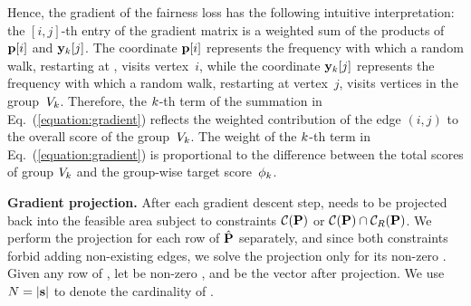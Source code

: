 \documentclass[sigconf, anonymous, review]{acmart}
\begin{document}
Hence, the gradient of the fairness loss has the following intuitive interpretation:
the $[i, j]$-th entry of the gradient matrix is a weighted sum of the products of 
$\mathbf{{p}}[i]$ and $\mathbf{{y}}_k[j]$. 
The coordinate $\mathbf{{p}}[i]$ represents the frequency with which a random walk, restarting at \vectv, visits vertex~$i$, 
while the coordinate $\mathbf{{y}}_k[j]$ represents the frequency with which a random walk, restarting at vertex~$j$, 
visits vertices in the group~$V_k$. 
Therefore, the $k$-th term of the summation in Eq.~(\ref{equation:gradient})
reflects the weighted contribution of the edge $(i, j)$ 
to the overall \pagerank score of the group~$V_k$.
The weight of the $k$-th term  in Eq.~(\ref{equation:gradient}) 
is proportional to the difference between the total \pagerank scores 
of group $V_k$ and the group-wise target score~$\phi_k$.

\vspace{1mm}
\noindent
\textbf{Gradient projection.} 
After each gradient descent step, 
\newtransmatrix needs to be projected back into the feasible area subject to constraints $\mathcal{C}(\mathbf{{P}})$ or $\mathcal{C}(\mathbf{{P}}) \cap \mathcal{C}_R(\mathbf{{P}})$.
We perform the projection for each row of $\hat{\mathbf{{P}}}$ separately, and since both constraints forbid adding non-existing edges, we solve the projection only for its non-zero . Given any row of \newtransmatrix, let \vects be  non-zero , and \vectsopt be the vector after projection. We use $N = |
\mathbf{{s}}|$ to denote the cardinality of \vects.
\end{document}
